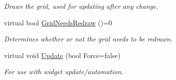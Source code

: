\begin{DoxyCompactItemize}
\begin{DoxyCompactList}\small\item\em Draws the grid, used for updating after any change. \item\end{DoxyCompactList}\item 
\hypertarget{classphys_1_1UI_1_1CellGrid_aa4c2f8c2c5f11ce5cffa1b8a1c44d57d}{
virtual bool \hyperlink{classphys_1_1UI_1_1CellGrid_aa4c2f8c2c5f11ce5cffa1b8a1c44d57d}{GridNeedsRedraw} ()=0}
\label{classphys_1_1UI_1_1CellGrid_aa4c2f8c2c5f11ce5cffa1b8a1c44d57d}

\begin{DoxyCompactList}\small\item\em Determines whether or not the grid needs to be redrawn. \item\end{DoxyCompactList}\item 
\hypertarget{classphys_1_1UI_1_1CellGrid_ae72ca5a4a8924596df199c66e64c136f}{
virtual void \hyperlink{classphys_1_1UI_1_1CellGrid_ae72ca5a4a8924596df199c66e64c136f}{Update} (bool Force=false)}
\label{classphys_1_1UI_1_1CellGrid_ae72ca5a4a8924596df199c66e64c136f}

\begin{DoxyCompactList}\small\item\em For use with widget update/automation. \item\end{DoxyCompactList}\end{DoxyCompactItemize}
